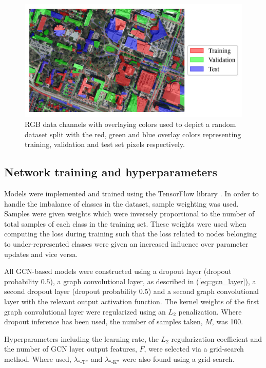 \documentclass[
twocolumn,
]{ceurart}
\begin{document}
\begin{figure}[!t]
\centering
\includegraphics[width=\columnwidth]{figures/dataset_split.jpg}
\caption{RGB data channels with overlaying colors used to depict a random dataset split with the red, green and blue overlay colors representing training, validation and test set pixels respectively.}
\label{fig::dataset_split}
\end{figure}

\subsection{Network training and hyperparameters}
Models were implemented and trained using the TensorFlow library \cite{Abadi2015}.
In order to handle the imbalance of classes in the dataset, sample weighting was used.
Samples were given weights which were inversely proportional to the number of total samples of each class in the training set.
These weights were used when computing the loss during training such that the loss related to nodes belonging to under-represented classes were given an increased influence over parameter updates and vice versa.

All GCN-based models were constructed using a dropout layer (dropout probability $0.5$), a graph convolutional layer, as described in (\ref{eq::gcn_layer}), a second dropout layer (dropout probability $0.5$) and a second graph convolutional layer with the relevant output activation function.
The kernel weights of the first graph convolutional layer were regularized using an $L_2$ penalization.
Where dropout inference has been used, the number of samples taken, $M$, was 100.

Hyperparameters including the learning rate, the $L_2$ regularization coefficient and the number of GCN layer output features, $F$, were selected via a grid-search method.
Where used, $\lambda_{\text{``-T''}}$ and $\lambda_{\text{``-K''}}$ were also found using a grid-search.
\end{document}
